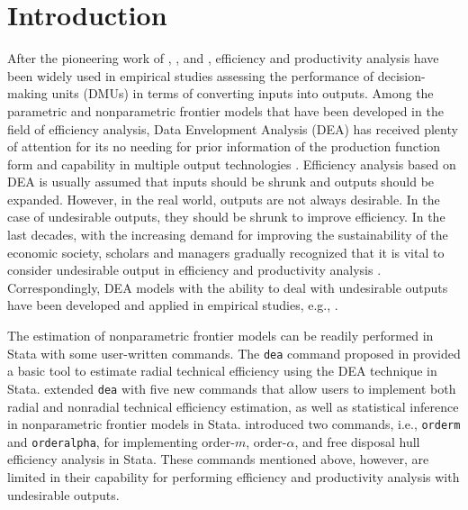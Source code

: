 
\section{Introduction}\label{sec_intro}
After the pioneering work of \cite{Farrell1957}, \cite{Debreu1951}, and \cite{koopmans1951analysis}, efficiency and productivity analysis have been widely used in empirical studies assessing the performance of decision-making units (DMUs) in terms of converting inputs into outputs. 
Among the parametric and nonparametric frontier models that have been developed in the field of efficiency analysis, Data Envelopment Analysis (DEA) has received plenty of attention for its no needing for prior information of the production function form and capability in multiple output technologies \citep{Fare1985,Fare1994}. 
Efficiency analysis based on DEA is usually assumed that inputs should be shrunk and outputs should be expanded. However, in the real
world, outputs are not always desirable. In the case of undesirable outputs, they should be shrunk to improve efficiency.
In the last decades, with the increasing demand for improving the sustainability of the economic society, scholars and managers gradually recognized that it is vital to consider undesirable output in efficiency and productivity analysis \citep{Chung1997,Mahlberg2011}. Correspondingly, DEA models with the ability to deal with undesirable outputs have been developed and applied in empirical studies, e.g., \citep{Zhou2012,Lin2015}. 

The estimation of nonparametric frontier models can be readily performed in Stata with some user-written commands. 
The {\tt dea} command proposed in \cite{Ji2010} provided a basic tool to estimate radial technical efficiency using the DEA technique in Stata. 
\cite{Badunenko2016} extended {\tt dea} with five new commands that allow users to implement both radial and nonradial technical efficiency estimation, as well as statistical inference in nonparametric frontier models in Stata. 
\cite{Tauchmann2012} introduced two commands, i.e., {\tt orderm} and {\tt orderalpha}, for implementing order-$m$, order-$\alpha$, and free disposal hull efficiency analysis in Stata. 
These commands mentioned above, however, are limited in their capability for performing efficiency and productivity analysis with undesirable outputs. 

